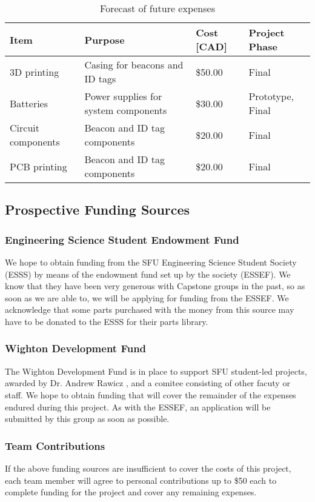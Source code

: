 \begin{table}[H]
\centering
\begin{tabular}{ | m{3.5cm} | m{6.25cm} | m{2.5cm} | m{3cm} |}
\hline
\textbf{Item} & \textbf{Purpose} & \textbf{Cost [CAD]} & \textbf{Project Phase}  \\
\hline
3D printing & Casing for beacons and ID tags & \$50.00 & Final  \\
\hline
Batteries & Power supplies for system components & \$30.00 & Prototype, Final \\
\hline
Circuit components & Beacon and ID tag components & \$20.00 & Final \\
\hline
PCB printing & Beacon and ID tag components & \$20.00 & Final \\
\hline
\end{tabular}
\caption{Forecast of future expenses}
\end{table}

\pagebreak

\subsection{Prospective Funding Sources}
\subsubsection{Engineering Science Student Endowment Fund}
We hope to obtain funding from the SFU Engineering Science Student Society (ESSS) by means of the endowment fund set up by the society (ESSEF). We know that they have been very generous with Capstone groups in the past, so as soon as we are able to, we will be applying for funding from the ESSEF. We acknowledge that some parts purchased with the money from this source may have to be donated to the ESSS for their parts library.

\subsubsection{Wighton Development Fund}
The Wighton Development Fund is in place to support SFU student-led projects, awarded by Dr. Andrew Rawicz \cite{R4-1}, and a comitee consisting of other facuty or staff. We hope to obtain funding that will cover the remainder of the expenses endured during this project. As with the ESSEF, an application will be submitted by this group as soon as possible.

\subsubsection{Team Contributions}
If the above funding sources are insufficient to cover the costs of this project, each team member will agree to personal contributions up to \$50 each to complete funding for the project and cover any remaining expenses.




